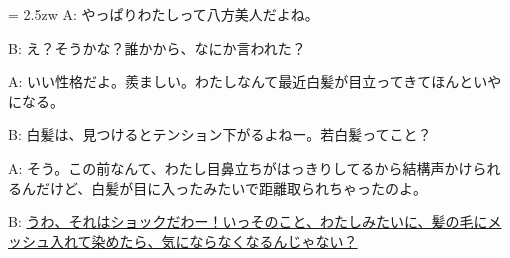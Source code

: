 \documentclass[11pt]{amsart}
\title{}
\author{}
\newenvironment{hangall}[1]{\hangindent = 2.5zw\everypar{\hangindent = 2.5zw}}{}
\begin{document}
\maketitle
\begin{hangall}{}%
A: やっぱりわたしって八方美人だよね。

B: え？そうかな？誰かから、なにか言われた？

A: いい性格だよ。羨ましい。わたしなんて最近白髪が目立ってきてほんといやになる。

B: 白髪は、見つけるとテンション下がるよねー。若白髪ってこと？

A: そう。この前なんて、わたし目鼻立ちがはっきりしてるから結構声かけられるんだけど、白髪が目に入ったみたいで距離取られちゃったのよ。

B: \ul{うわ、それはショックだわー！いっそのこと、わたしみたいに、髪の毛にメッシュ入れて染めたら、気にならなくなるんじゃない？}\end{hangall}
\end{document}
